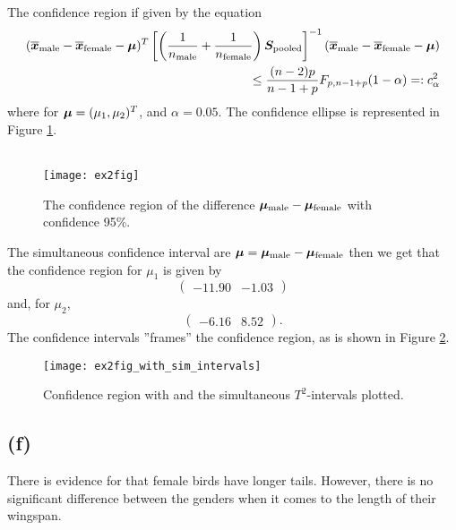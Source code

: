 The confidence region if given by the equation
\begin{align}
  \label{eq:ex2-conf-region}
 (\overline{\bm{x}}_{\rm male}  - \overline{\bm{x}}_{\rm female} - \bm{\mu})^{T}
\left[
  \left(
    \frac{1}{n_{\rm male}} + \frac{1}{n_{\rm female}}
  \right)
  \bm{S}_{\rm pooled}
\right]^{-1} (\overline{\bm{x}}_{\rm male}  - \overline{\bm{x}}_{\rm female} - \bm{\mu}) \nonumber
\\
\leq \frac{(n-2)p}{n-1+p}F_{p, n-1+p}(1-\alpha) =:c^{2}_{\alpha}
\end{align}
where for $\bm{\mu} = (\mu_1, \mu_2)^{T}$, and $\alpha = 0.05$. The confidence
ellipse is represented in Figure \ref{fig:ex2fig}.\\
\\
\begin{figure}[h]
  \centering
  \texttt{[image: ex2fig]}
  \caption{The confidence region of the difference
    $\bm{\mu}_{\rm male} - \bm{\mu}_{\rm female}$ with confidence 95\%. }
  \label{fig:ex2fig}
\end{figure}
The simultaneous confidence interval are $\bm{\mu} = \bm{\mu}_{\rm male}- \bm{\mu}_{\rm female}$ then we get that the confidence region for $\mu_{1}$
is given by 
\begin{equation*}
  \begin{pmatrix}
   -11.90 &-1.03  
  \end{pmatrix}
\end{equation*}
and, for $\mu_{2}$, 
\begin{equation*}
  \begin{pmatrix}
   -6.16 &8.52  
  \end{pmatrix}.
\end{equation*}
The confidence intervals ''frames'' the confidence region, as is shown
in Figure \ref{fig:ex2_sim_intervals}. 
\begin{figure}[h]
  \centering
  \texttt{[image: ex2fig\_with\_sim\_intervals]}
  \caption{Confidence region with and the simultaneous $T^{2}$-intervals plotted. }
  \label{fig:ex2_sim_intervals}
\end{figure}
\subsection*{(f)}
\label{sec:f}
There is evidence for that female birds have longer tails. However,
there is no significant difference between the genders when it comes to
the length of their wingspan. 


